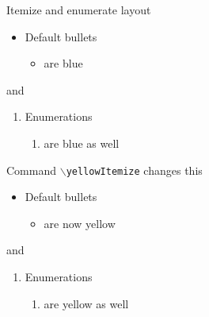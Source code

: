 \documentclass[aspectratio=169]{beamer}
\begin{document}
\begin{frame}{Itemize and enumerate layout}
\begin{itemize}
	\item Default bullets
	\begin{itemize}
		\item are blue
	\end{itemize}
\end{itemize}
and
\begin{enumerate}
	\item Enumerations 
	\begin{enumerate}
		\item are blue as well
	\end{enumerate}
\end{enumerate}
Command \texttt{$\backslash$yellowItemize} changes this
\yellowItemize
\begin{itemize}
	\item Default bullets
	\begin{itemize}
		\item are now yellow
	\end{itemize}
\end{itemize}
and 
\begin{enumerate}
	\item Enumerations 
	\begin{enumerate}
		\item are yellow as well
	\end{enumerate}
\end{enumerate}

\end{frame}
\end{document}
